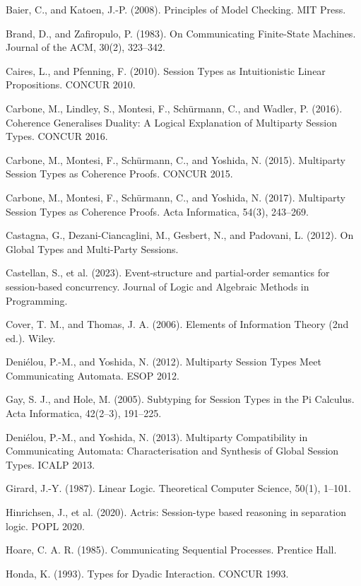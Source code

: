 \documentclass[a4paper,10pt,twocolumn,english]{article}
\numberwithin{equation}{section}
\theoremstyle{paperdef}
\theoremstyle{paperplain}
\theoremstyle{paperdef}
\theoremstyle{paperremark}
\newenvironment{citelist}{%
  \begin{list}{}{%
    \setlength{\leftmargin}{1.25em}%
    \setlength{\itemindent}{-1.25em}%
    \setlength{\itemsep}{2pt}%
    \setlength{\parsep}{0pt}%
    \setlength{\topsep}{3pt}}%
}{\end{list}}
\begin{document}
\begin{citelist}
	\item Baier, C., and Katoen, J.-P. (2008). Principles of Model Checking. MIT Press.
	\item Brand, D., and Zafiropulo, P. (1983). On Communicating Finite-State Machines. Journal of the ACM, 30(2), 323--342.
	\item Caires, L., and Pfenning, F. (2010). Session Types as Intuitionistic Linear Propositions. CONCUR 2010.
	\item Carbone, M., Lindley, S., Montesi, F., Sch\"urmann, C., and Wadler, P. (2016). Coherence Generalises Duality: A Logical Explanation of Multiparty Session Types. CONCUR 2016.
	\item Carbone, M., Montesi, F., Sch\"urmann, C., and Yoshida, N. (2015). Multiparty Session Types as Coherence Proofs. CONCUR 2015.
	\item Carbone, M., Montesi, F., Sch\"urmann, C., and Yoshida, N. (2017). Multiparty Session Types as Coherence Proofs. Acta Informatica, 54(3), 243--269.
	\item Castagna, G., Dezani-Ciancaglini, M., Gesbert, N., and Padovani, L. (2012). On Global Types and Multi-Party Sessions.
	\item Castellan, S., et al. (2023). Event-structure and partial-order semantics for session-based concurrency. Journal of Logic and Algebraic Methods in Programming.
	\item Cover, T. M., and Thomas, J. A. (2006). Elements of Information Theory (2nd ed.). Wiley.
	\item Deni\'{e}lou, P.-M., and Yoshida, N. (2012). Multiparty Session Types Meet Communicating Automata. ESOP 2012.
	\item Gay, S. J., and Hole, M. (2005). Subtyping for Session Types in the Pi Calculus. Acta Informatica, 42(2--3), 191--225.
	\item Deni\'{e}lou, P.-M., and Yoshida, N. (2013). Multiparty Compatibility in Communicating Automata: Characterisation and Synthesis of Global Session Types. ICALP 2013.
	\item Girard, J.-Y. (1987). Linear Logic. Theoretical Computer Science, 50(1), 1--101.
	\item Hinrichsen, J., et al. (2020). Actris: Session-type based reasoning in separation logic. POPL 2020.
	\item Hoare, C. A. R. (1985). Communicating Sequential Processes. Prentice Hall.
	\item Honda, K. (1993). Types for Dyadic Interaction. CONCUR 1993.

\end{citelist}
\end{document}
